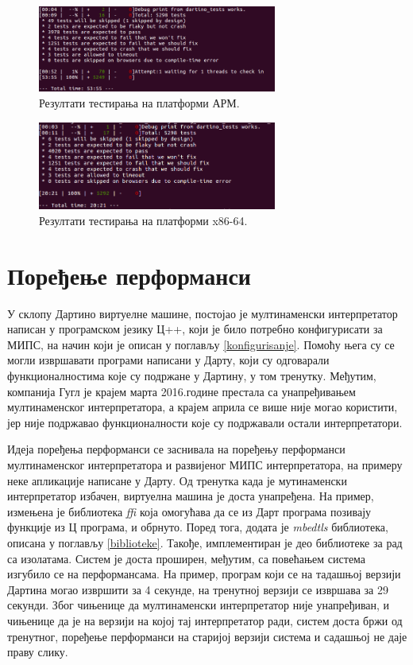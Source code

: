 \documentclass[12pt,oneside]{memoir}
\begin{document}
\begin{figure}[!ht]
  \centering
  \includegraphics[width=0.7\textwidth]{testovi-arm.png}
  \caption{Резултати тестирања на платформи АРМ.}
  \label{fig:arm}
\end{figure}

\begin{figure}[!ht]
  \centering
  \includegraphics[width=0.7\textwidth]{testovi_x64.png}
  \caption{Резултати тестирања на платформи x86-64.}
  \label{fig:x86}
\end{figure}

\section{Поређење перформанси}
\label{sec:aplikacija}
У склопу Дартино виртуелне машине, постојао је мултинаменски интерпретатор написан у програмском језику Ц++, који је било потребно конфигурисати за МИПС, на начин који је описан у поглављу \ref{konfigurisanje}. Помоћу њега су се могли извршавати програми написани у Дарту, који су одговарали функционалностима које су подржане у Дартину, у том тренутку. Међутим, компанија Гугл је крајем марта 2016.године престала са унапређивањем мултинаменског интерпретатора, а крајем априла се више није могао користити, јер није подржавао функционалности које су подржавали остали интерпретатори.

Идеја поређења перформанси се заснивала на поређењу перформанси мултинаменског интерпретатора и развијеног МИПС интерпретатора, на примеру неке апликације написане у Дарту. Од тренутка када је мутинаменски интерпретатор избачен, виртуелна машина је доста унапређена. На пример, измењена је библиотека \textit{ffi} која омогућава да се из Дарт програма позивају функције из Ц програма, и обрнуто. Поред тога, додата је \textit{mbedtls} библиотека, описана у поглављу \ref{biblioteke}. Такође, имплементиран је део библиотеке за рад са изолатама. Систем је доста проширен, међутим, са повећањем система изгубило се на перформансама. На пример, програм који се на тадашњој верзији Дартина могао извршити за 4 секунде, на тренутној верзији се извршава за 29 секунди. Због чињенице да мултинаменски интерпретатор није унапређиван, и чињенице да је на верзији на којој тај интерпретатор ради, систем доста бржи од тренутног, поређење перформанси на старијој верзији система и садашњој не даје праву слику.
\end{document}
